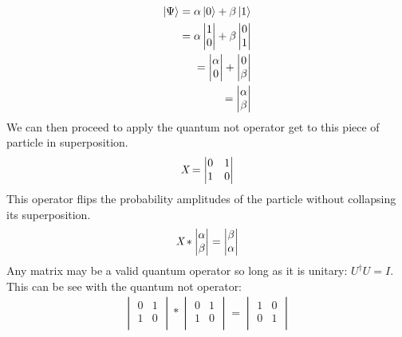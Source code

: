 \documentclass[conference]{IEEEtran}
\begin{document}
\begin{align*}
\ket{\Psi} = \alpha\ket{0} + \beta\ket{1} \\
 = \alpha \begin{vmatrix}
1\\
0\\
\end{vmatrix} + \beta \begin{vmatrix}
0\\
1\\
\end{vmatrix} \\
=  \begin{vmatrix}
\alpha\\
0\\
\end{vmatrix} +  \begin{vmatrix}
0\\
\beta\\
\end{vmatrix} \\
 =  \begin{vmatrix}
\alpha\\
\beta\\
\end{vmatrix} 
\end{align*}
We can then proceed to apply the quantum not operator get to this piece of particle in superposition. 
\begin{align*}
    \emph{X} = \begin{vmatrix}
    0 & 1 \\
    1 & 0 \\
    \end{vmatrix}
\end{align*}
This operator flips the probability amplitudes of the particle without collapsing its superposition.
\begin{align*}
    \emph{X} * \begin{vmatrix}
\alpha\\
\beta\\
\end{vmatrix} = \begin{vmatrix}
\beta\\
\alpha\\
\end{vmatrix} 
\end{align*}
Any matrix may be a valid quantum operator so long as it is unitary: $U^\dagger U = I$. This can be see with the quantum not operator: 
\begin{align*}
    \begin{vmatrix}
    0 & 1 \\
    1 & 0 \\
    \end{vmatrix} * \begin{vmatrix}
    0 & 1 \\
    1 & 0 \\
    \end{vmatrix} =
    \begin{vmatrix}
    1 & 0 \\
    0 & 1 \\
    \end{vmatrix}
\end{align*}
\end{document}
